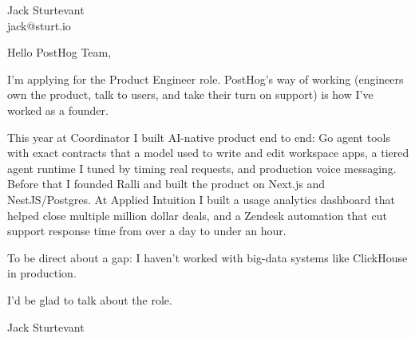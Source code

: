 \documentclass[11pt]{article}
\begin{document}
\raggedright

{\namefont\fontsize{20pt}{24pt}\selectfont Jack Sturtevant}\\[-0.3em]
jack@sturt.io

\vspace{1.2em}

Hello PostHog Team,

I'm applying for the Product Engineer role. PostHog's way of working (engineers own the product, talk to users, and take their turn on support) is how I've worked as a founder.

This year at Coordinator I built AI-native product end to end: Go agent tools with exact contracts that a model used to write and edit workspace apps, a tiered agent runtime I tuned by timing real requests, and production voice messaging. Before that I founded Ralli and built the product on Next.js and NestJS/Postgres. At Applied Intuition I built a usage analytics dashboard that helped close multiple million dollar deals, and a Zendesk automation that cut support response time from over a day to under an hour.

To be direct about a gap: I haven't worked with big-data systems like ClickHouse in production.

I'd be glad to talk about the role.

\vspace{0.6em}
Jack Sturtevant
\end{document}
